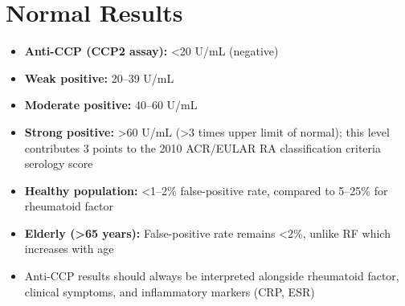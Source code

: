 \section*{Normal Results}
\begin{itemize}
  \item \textbf{Anti-CCP (CCP2 assay):} <20 U/mL (negative)
  \item \textbf{Weak positive:} 20--39 U/mL
  \item \textbf{Moderate positive:} 40--60 U/mL
  \item \textbf{Strong positive:} >60 U/mL (>3 times upper limit of normal); this level contributes 3 points to the 2010 ACR/EULAR RA classification criteria serology score
  \item \textbf{Healthy population:} <1--2\% false-positive rate, compared to 5--25\% for rheumatoid factor
  \item \textbf{Elderly (>65 years):} False-positive rate remains <2\%, unlike RF which increases with age
  \item Anti-CCP results should always be interpreted alongside rheumatoid factor, clinical symptoms, and inflammatory markers (CRP, ESR)
\end{itemize}

